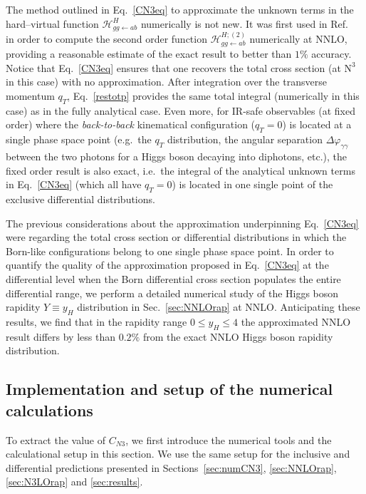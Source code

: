 \documentclass[12pt]{article}
\DeclareRobustCommand{\qt}{\ensuremath{q_T}\xspace}
\DeclareRobustCommand{\cH}{\ensuremath{\mathcal{H}}}
\DeclareRobustCommand{\LO}{\text{LO}\xspace}
\DeclareRobustCommand{\N}[1]{\ensuremath{\text{N}^{#1}}} %
\begin{document}
The method outlined in Eq.~\eqref{CN3eq} to approximate the unknown terms in the hard--virtual function $\cH^H_{gg\gets ab}$ numerically is not new. It was first used in Ref.~\cite{Bozzi:2005wk} in order to compute the second order function $\cH^{H;(2)}_{gg\gets ab}$ numerically at NNLO, providing a reasonable estimate of the exact result to better than $1\%$ accuracy. Notice that Eq.~\eqref{CN3eq} ensures that one recovers the total cross section (at \N3\LO in this case) with no approximation. After integration over the transverse momentum $\qt$, Eq.~\eqref{restotp} provides the same total integral (numerically in this case)  as in the fully analytical case. Even more, for IR-safe observables (at fixed order) where the \textit{back-to-back} kinematical configuration ($\qt=0$) is located at a single phase space point (e.g.\ the $\qt$ distribution, the angular separation $\Delta \varphi _{\gamma\gamma}$ between the two photons for a Higgs boson decaying into diphotons, etc.), the fixed order result is also exact, i.e.\ the integral of the analytical unknown terms in Eq.~\eqref{CN3eq} (which all have $\qt=0$) is located in one single point of the exclusive differential distributions. 

The previous considerations about the approximation underpinning Eq.~\eqref{CN3eq} were regarding the total cross section or differential distributions in which the Born-like configurations belong to one single phase space point.
In order to quantify the quality of the approximation proposed in Eq.~\eqref{CN3eq} at the differential level when the Born differential cross section populates the entire differential range, we perform a detailed numerical study of the Higgs boson rapidity $Y \equiv y_{H}$ distribution in Sec.~\ref{sec:NNLOrap} at NNLO. Anticipating these results,  we find that in the rapidity range $0\leq y_{H}\leq 4$ the approximated NNLO result differs by less than $0.2\%$ from the exact NNLO Higgs boson rapidity distribution.


\subsection{Implementation and setup of the numerical calculations}
\label{sec:numsetup}

To extract the value of $C_{N3}$, we first introduce the numerical tools and the calculational setup in this section. We use the same setup for the inclusive and differential predictions presented in Sections~\ref{sec:numCN3}, \ref{sec:NNLOrap}, \ref{sec:N3LOrap} and \ref{sec:results}.
\end{document}
